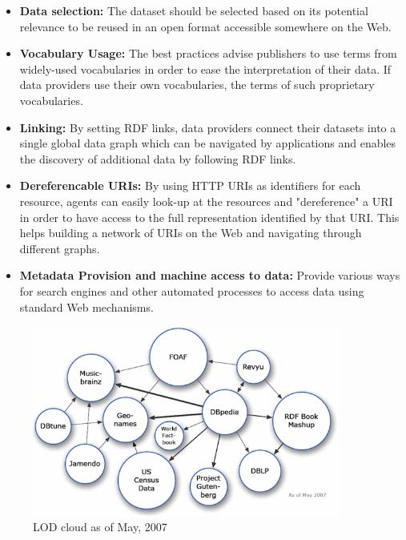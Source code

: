 \begin{itemize}
\item \textbf{Data selection:} The dataset should be selected based on its potential relevance to be reused in an open format accessible somewhere on the Web.
\item \textbf{Vocabulary Usage:} The best practices advise publishers to use terms from widely-used vocabularies in order to ease the interpretation of their data. If data providers use their own vocabularies, the terms of such proprietary vocabularies.

\item \textbf{Linking:} By setting RDF links, data providers connect their datasets into a single global data graph which can be navigated by applications and enables the discovery of additional data by following RDF links.

\item \textbf{Dereferencable URIs:} By using HTTP URIs as identifiers for each resource, agents can easily look-up at the resources and "dereference" a URI in order to have access to the full representation identified by that URI. This helps building a network of URIs on the Web and navigating through different graphs. 

\item \textbf{Metadata Provision and machine access to data:} Provide various ways for search engines and other automated processes to access data using standard Web mechanisms.
\end{itemize}

\begin{figure}[ht!]
\includegraphics[width=0.9\textwidth]{img/lod-cloud2007.png}
\caption{LOD cloud as of May, 2007}
\label{fig:lodcloud2007}
\end{figure}

